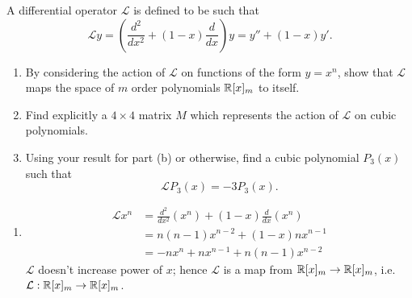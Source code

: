 \documentclass[10pt, a4paper]{article}
\begin{document}
\begin{problem}[Resit $2022$]
    A differential operator $\mathcal{L}$ is defined to be such that
    \[
    \mathcal{L}y = \left(\frac{d ^ 2}{dx ^ 2} + (1 - x)\frac{d}{dx}\right)y = y'' + (1 - x)y'.
    \]
    \begin{enumerate}[label = (\alph*)]
        \item By considering the action of $\mathcal{L}$ on functions of the form $y = x ^ n$,
        show that $\mathcal{L}$ maps the space of $m$ order polynomials $\mathbb{R}[x]_m$ to itself.

        \item Find explicitly a $4 \times 4$ matrix $M$ which represents the action of $\mathcal{L}$ on cubic polynomials.

        \item Using your result for part (b) or otherwise,
        find a cubic polynomial $P_3(x)$ such that
        \[
        \mathcal{L}P_3(x) = -3P_3(x).
        \]
        
    \end{enumerate}

    \begin{solution}
        \begin{enumerate}[label = (\alph*)]
            \item 
            \begin{align*}
                \mathcal{L}x ^ n &= \frac{d ^ 2}{dx ^ 2}(x ^ n) + (1 - x)\frac{d}{dx}(x ^ n) \\
                &= n(n - 1)x ^ {n - 2} + (1 - x)nx ^ {n - 1} \\
                &= -nx ^ n + nx ^ {n - 1} + n(n - 1)x ^ {n - 2}
            \end{align*}
            $\mathcal{L}$ doesn't increase power of $x$;
            hence $\mathcal{L}$ is a map from $\mathbb{R}[x]_m \rightarrow \mathbb{R}[x]_m$,
            i.e. $\mathcal{L} : \mathbb{R}[x]_m \rightarrow \mathbb{R}[x]_m$.


\end{enumerate}
\end{solution}
\end{problem}
\end{document}

